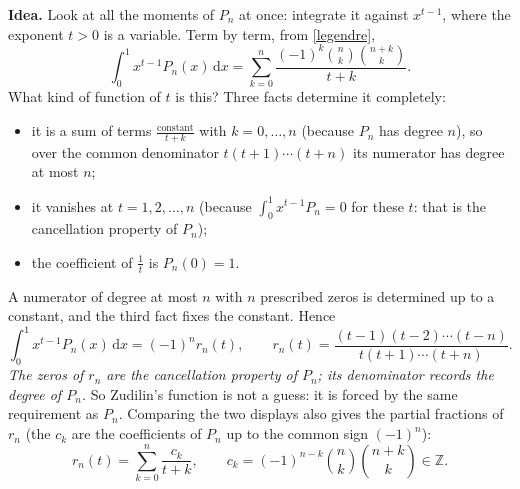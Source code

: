 \documentclass[11pt]{article}
\newcommand{\Z}{\mathbb Z}
\newcommand{\dd}{\,\mathrm d}
\theoremstyle{remark}
\newcommand{\q}[1]{\medskip\noindent\textbf{#1}}
\begin{document}
\q{Idea.} Look at all the moments of $P_n$ at once: integrate it against $x^{t-1}$, where the
exponent $t>0$ is a variable. Term by term, from \eqref{legendre},
\[
\int_0^1x^{t-1}P_n(x)\dd x=\sum_{k=0}^n\frac{(-1)^k\binom nk\binom{n+k}k}{t+k}.
\]
What kind of function of $t$ is this? Three facts determine it completely:
\begin{itemize}
\item it is a sum of terms $\frac{\text{constant}}{t+k}$ with $k=0,\dots,n$ (because $P_n$ has
degree $n$), so over the common denominator $t(t+1)\cdots(t+n)$ its numerator has degree at most $n$;
\item it vanishes at $t=1,2,\dots,n$ (because $\int_0^1x^{t-1}P_n=0$ for these $t$: that is the
cancellation property of $P_n$);
\item the coefficient of $\frac1t$ is $P_n(0)=1$.
\end{itemize}
A numerator of degree at most $n$ with $n$ prescribed zeros is determined up to a constant, and
the third fact fixes the constant. Hence
\begin{equation}\label{mellin}
\int_0^1x^{t-1}P_n(x)\dd x=(-1)^n r_n(t),\qquad
r_n(t)=\frac{(t-1)(t-2)\cdots(t-n)}{t(t+1)\cdots(t+n)} .
\end{equation}
\emph{The zeros of $r_n$ are the cancellation property of $P_n$; its denominator records the
degree of $P_n$.} So Zudilin's function is not a guess: it is forced by the same requirement as
$P_n$. Comparing the two displays also gives the partial fractions of $r_n$ (the $c_k$ are the
coefficients of $P_n$ up to the common sign $(-1)^n$):
\begin{equation}\label{pf}
r_n(t)=\sum_{k=0}^n\frac{c_k}{t+k},\qquad c_k=(-1)^{n-k}\binom nk\binom{n+k}k\in\Z .
\end{equation}
\end{document}
